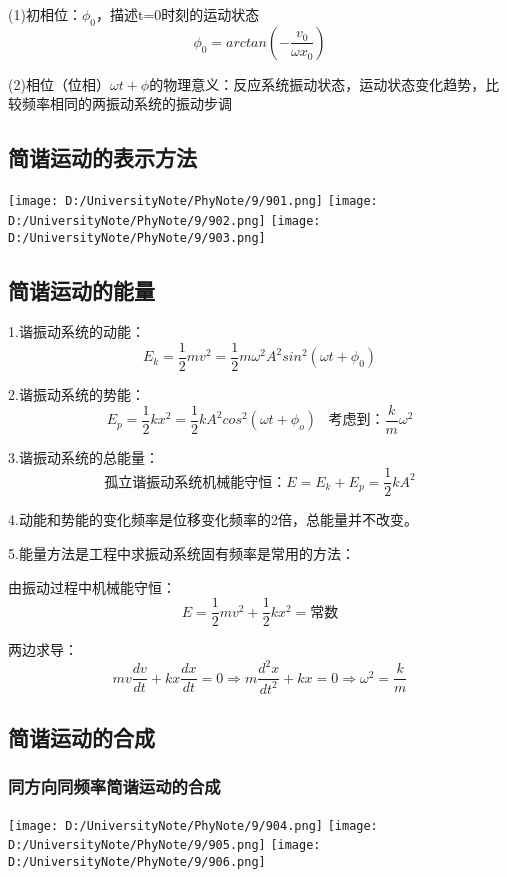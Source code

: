 \documentclass[UTF8]{article}
\begin{document}
    (1)初相位：$\phi_0$，描述t=0时刻的运动状态
    \[\phi_0 = arctan(-\frac{v_0}{\omega x_0})\]

    (2)相位（位相）$\omega t + \phi$的物理意义：反应系统振动状态，运动状态变化趋势，比较频率相同的两振动系统的振动步调

\subsection{简谐运动的表示方法}

    \texttt{[image: D:/UniversityNote/PhyNote/9/901.png]}
    \texttt{[image: D:/UniversityNote/PhyNote/9/902.png]}
    \texttt{[image: D:/UniversityNote/PhyNote/9/903.png]}

\subsection{简谐运动的能量}

    1.谐振动系统的动能：
    \[E_k = \frac{1}{2}mv^2 = \frac{1}{2}m\omega^2 A^2sin^2(\omega t + \phi_0)\]

    2.谐振动系统的势能：
    \[E_p = \frac{1}{2}kx^2 = \frac{1}{2}kA^2cos^2(\omega t + \phi_o)\;\;\;\mbox{考虑到：}\frac{k}{m}\omega^2\]

    3.谐振动系统的总能量：
    \[\mbox{孤立谐振动系统机械能守恒：}E = E_k + E_p = \frac{1}{2}kA^2\]

    4.动能和势能的变化频率是位移变化频率的2倍，总能量并不改变。

    5.能量方法是工程中求振动系统固有频率是常用的方法：

    由振动过程中机械能守恒：
    \[E = \frac{1}{2}mv^2 + \frac{1}{2}kx^2 = \mbox{常数}\]

    两边求导：
    \[mv\frac{dv}{dt} + kx\frac{dx}{dt} = 0\Longrightarrow m\frac{d^2x}{dt^2} + kx = 0\Longrightarrow \omega^2 = \frac{k}{m}\]

\subsection{简谐运动的合成}
\subsubsection{同方向同频率简谐运动的合成}

    \texttt{[image: D:/UniversityNote/PhyNote/9/904.png]}
    \texttt{[image: D:/UniversityNote/PhyNote/9/905.png]}
    \texttt{[image: D:/UniversityNote/PhyNote/9/906.png]}
\end{document}
